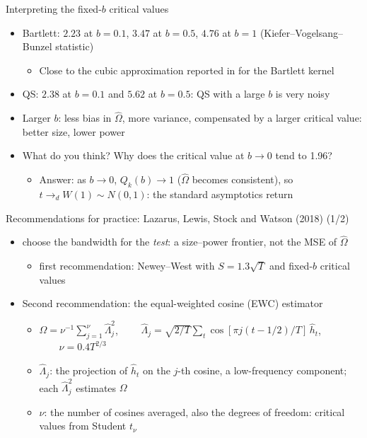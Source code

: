 \begin{frame}{Interpreting the fixed-$b$ critical values}
\itemsize{\small}
\begin{itemize}
    \item Bartlett: $2.23$ at $b = 0.1$, $3.47$ at $b = 0.5$, $4.76$ at $b = 1$ (Kiefer--Vogelsang--Bunzel statistic)
    \begin{itemize}
        \item Close to the cubic approximation reported in  for the Bartlett kernel
    \end{itemize}
    \item QS: $2.38$ at $b = 0.1$ and $5.62$ at $b = 0.5$: QS with a large $b$ is very noisy
    \item Larger $b$: less bias in $\hat\Omega$, more variance, compensated by a larger critical value: better size, lower power
    \item What do you think? Why does the critical value at $b \to 0$ tend to 1.96?
    \begin{itemize}
        \item Answer: as $b \to 0$, $Q_k(b) \to 1$ ($\hat\Omega$ becomes consistent), so $t \to_d W(1) \sim N(0,1)$: the standard asymptotics return
    \end{itemize}
\end{itemize}
\end{frame}

\begin{frame}{Recommendations for practice: Lazarus, Lewis, Stock and Watson (2018) (1/2)}
\itemsize{\small}
\begin{itemize}
    \item {} choose the bandwidth for the \emph{test}: a size--power frontier, not the MSE of $\hat\Omega$
    \begin{itemize}
        \item first recommendation: Newey--West with $S = 1.3\sqrt{T}$ and fixed-$b$ critical values
    \end{itemize}
    \item Second recommendation: the equal-weighted cosine (EWC) estimator
    \begin{itemize}
        \item $\hat\Omega = \nu^{-1}\sum_{j=1}^{\nu}\hat\Lambda_j^2$, $\qquad \hat\Lambda_j = \sqrt{2/T}\sum_t \cos[\pi j(t - 1/2)/T]\,\hat h_t$, $\qquad \nu = 0.4T^{2/3}$
        \item $\hat\Lambda_j$: the projection of $\hat h_t$ on the $j$-th cosine, a low-frequency component; each $\hat\Lambda_j^2$ estimates $\Omega$
        \item $\nu$: the number of cosines averaged, also the degrees of freedom: critical values from Student $t_\nu$
    \end{itemize}
\end{itemize}
\end{frame}

